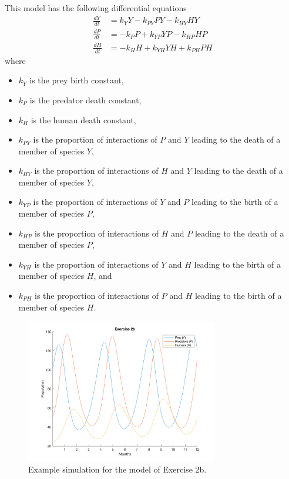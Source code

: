 \documentclass[12pt]{article}
\begin{document}
\begin{enumerate}
\begin{enumerate}
  			 This model has the following differential equations
  			\begin{align}
  				\frac{dY}{dt} &= k_{Y}Y - k_{PY}PY - k_{HY}HY\\
  				\frac{dP}{dt} &= -k_{P}P + k_{YP}YP - k_{HP}HP\\
  				\frac{dH}{dt} &= -k_{H}H + k_{YH}YH + k_{PH}PH
  			\end{align}
  			where
  			\begin{itemize}
  				\item $k_{Y}$ is the prey birth constant,
  				\item $k_{P}$ is the predator death constant,
  				\item $k_{H}$ is the human death constant,
  				\item $k_{PY}$ is the proportion of interactions of $P$ and $Y$ leading to the death of a member of species $Y$,
  				\item $k_{HY}$ is the proportion of interactions of $H$ and $Y$ leading to the death of a member of species $Y$,
  				\item $k_{YP}$ is the proportion of interactions of $Y$ and $P$ leading to the birth of a member of species $P$,
  				\item $k_{HP}$ is the proportion of interactions of $H$ and $P$ leading to the death of a member of species $P$,
  				\item $k_{YH}$ is the proportion of interactions of $Y$ and $H$ leading to the birth of a member of species $H$, and
  				\item $k_{PH}$ is the proportion of interactions of $P$ and $H$ leading to the birth of a member of species $H$.
  			\end{itemize}
  			
  			\begin{figure}[h]
    			\includegraphics[width=0.75\textwidth]{2b-1}
    			\centering
          \caption{Example simulation for the model of Exercise 2b.}
          \label{fig:2b-1}
        \end{figure}
        

\end{enumerate}
\end{enumerate}
\end{document}
